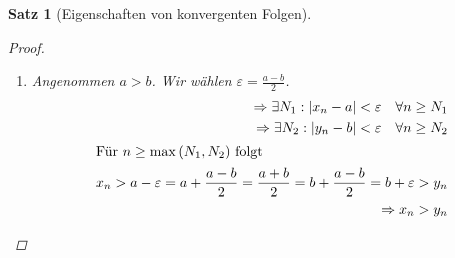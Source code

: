 \documentclass[11pt, twoside, a4paper]{article}
\theoremstyle{plain}
\newtheorem{satz}[blockelement]{Satz}
\newcommand{\pair}[1]{\left(#1\right)}
\newcommand{\abs}[1]{\left|#1\right|}
\newcommand{\impl}[0]{\Rightarrow{}}
\newcommand{\fromto}{\rightarrow{}}
\begin{document}
\begin{satz}[Eigenschaften von konvergenten Folgen]
\begin{proof}
\begin{enumerate}[label=(\alph*)]
\begin{align*}
                    \impl \abs{x_n} \fromto \abs{a}
                \end{align*}
                \item Angenommen $a > b$. Wir wählen $\varepsilon=\frac{a-b}{2}$.
                \begin{align*}
                    \impl \exists N_1: \abs{x_n-a} < \varepsilon \quad\forall n\geq N_1\\
                    \impl \exists N_2: \abs{y_n-b} < \varepsilon \quad\forall n\geq N_2\\
                    \intertext{Für $n\geq \max\pair{N_1,N_2}$ folgt}
                    x_n > a-\varepsilon = a + \frac{a-b}{2} = \frac{a+b}{2} = b+\frac{a-b}{2} = b + \varepsilon > y_n\\
                    \impl x_n > y_n
                \end{align*}
            \end{enumerate}
        \end{proof}
    \end{satz}

    \newpage
\end{document}
